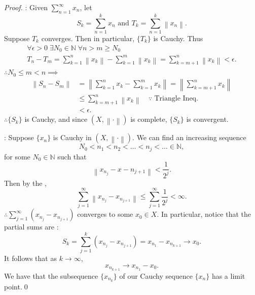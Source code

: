 \documentclass[notoc,notitlepage]{tufte-book}
\newcommand{\norm}[1]{\left\| #1 \right\|}
\begin{document}
\begin{proof}
  : Given $\sum_{n=1}^{\infty} x_n$, let
  \begin{equation*}
    S_k = \sum_{n=1}^{k} x_n \text{ and } T_k = \sum_{n=1}^{k} \norm{ x_n }.
  \end{equation*}
  Suppose $T_k$ converges. Then in particular, $\{ T_k \}$ is Cauchy. Thus
  \begin{gather*}
    \forall \epsilon > 0 \; \exists N_0 \in \mathbb{N} \; \forall n > m \geq N_0 \\
    T_n - T_m = \sum_{k=1}^{n} \norm{ x_k } - \sum_{k=1}^{m} \norm{ x_k } = \sum_{k = m + 1}^{n} \norm{ x_k } < \epsilon.
  \end{gather*}
  $\therefore N_0 \leq m < n \implies$
  \begin{align*}
    \norm{ S_n - S_m } &= \norm{ \sum_{k=1}^{n} x_k - \sum_{k=1}^{m} x_k } = \norm{ \sum_{k=m + 1}^{n} x_k } \\
                       &\leq \sum_{k=m + 1}^{n} \norm{ x_k } \quad \because \text{ Triangle Ineq. } \\
                       &< \epsilon.
  \end{align*}
  $\therefore \{ S_k \}$ is Cauchy, and since $(X, \norm\cdot)$ is complete, $\{ S_k \}$ is convergent.

  \noindent
  : Suppose $\{ x_n \}$ is Cauchy in $(X, \norm\cdot)$. We can find an increasing sequence
  \begin{equation*}
    N_0 < n_1 < n_2 < \hdots < n_j < \hdots \in \mathbb{N},
  \end{equation*}
  for some $N_0 \in \mathbb{N}$ such that
  \begin{equation*}
    \norm{ x_{n_j} - x-{n_{ j + 1 }} } < \frac{1}{2^j}.
  \end{equation*}
  Then by the ,
  \begin{equation*}
    \sum_{j=1}^{\infty} \norm{ x_{n_j} - x_{n_{j + 1}} } \leq \sum_{j=1}^{\infty} \frac{1}{2^j} < \infty.
  \end{equation*}
  $\therefore \sum\limits_{j=1}^{\infty} ( x_{n_j} - x_{n_{j + 1}} )$ converges to some $x_0 \in X$. In particular, notice that the partial sums are :
  \begin{equation*}
    S_k = \sum_{j=1}^{k} \left( x_{n_j} - x_{n_{j + 1}} \right) = x_{n_1} - x_{n_{k + 1}} \to x_0.
  \end{equation*}
  It follows that as $k \to \infty$,
  \begin{equation*}
    x_{n_{k + 1}} \to x_{n_1} - x_0.
  \end{equation*}
  We have that the subsequence $\{ x_{n_k} \}$ of our Cauchy sequence $\{ x_n \}$ has a limit point.\qed\
\end{proof}
\end{document}
